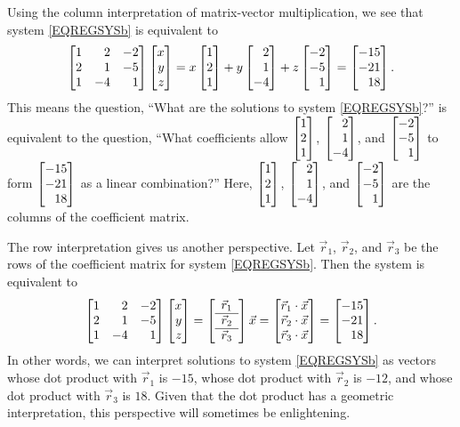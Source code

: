 
Using the column interpretation of matrix-vector multiplication, we see that system \eqref{EQREGSYSb} is equivalent to
\[
	\mat{1&2&-2\\2&1&-5\\1&-4&1}\mat{x\\y\\z}=
	     x\mat{1\\2\\1}+y\mat{2\\1\\-4}+z\mat{-2\\-5\\1}
	     =\mat{-15\\-21\\18}.
\]
This means the question, ``What are the solutions to system \eqref{EQREGSYSb}?'' is equivalent to the question, ``What coefficients
allow $\mat{1\\2\\1}$, $\mat{2\\1\\-4}$, and $\mat{-2\\-5\\1}$ to form $\mat{-15\\-21\\18}$ as a linear combination?'' Here,
 $\mat{1\\2\\1}$, $\mat{2\\1\\-4}$, and $\mat{-2\\-5\\1}$ are the columns of the coefficient matrix.


The row interpretation gives us another perspective. Let $\vec r_1$, $\vec r_2$, and $\vec r_3$ be the rows of the coefficient matrix
for system \eqref{EQREGSYSb}. Then the system is equivalent to
\[
	\mat{1&2&-2\\2&1&-5\\1&-4&1}\mat{x\\y\\z}=
	\left[\begin{array}{c}\vec r_1\\\hline\vec r_2\\\hline\vec r_3\end{array}\right]\vec x=
	\mat{\vec r_1\cdot \vec x\\\vec r_2\cdot\vec x\\\vec r_3\cdot \vec x}
	     =\mat{-15\\-21\\18}.
\]
In other words, we can interpret solutions to system \eqref{EQREGSYSb} as vectors whose dot product
with $\vec r_1$ is $-15$, whose dot product with $\vec r_2$ is $-12$, and whose dot product with
$\vec r_3$ is $18$. Given that the dot product has a geometric interpretation, this perspective will
sometimes be enlightening.

